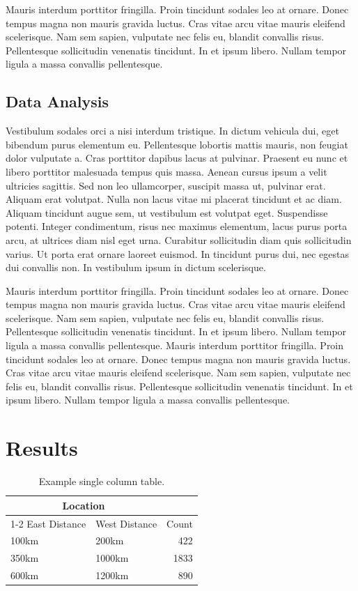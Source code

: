 Mauris interdum porttitor fringilla. Proin tincidunt sodales leo at ornare. Donec tempus magna non mauris gravida luctus. Cras vitae arcu vitae mauris eleifend scelerisque. Nam sem sapien, vulputate nec felis eu, blandit convallis risus. Pellentesque sollicitudin venenatis tincidunt. In et ipsum libero. Nullam tempor ligula a massa convallis pellentesque.

\subsection{Data Analysis}

Vestibulum sodales orci a nisi interdum tristique. In dictum vehicula dui, eget bibendum purus elementum eu. Pellentesque lobortis mattis mauris, non feugiat dolor vulputate a. Cras porttitor dapibus lacus at pulvinar. Praesent eu nunc et libero porttitor malesuada tempus quis massa. Aenean cursus ipsum a velit ultricies sagittis. Sed non leo ullamcorper, suscipit massa ut, pulvinar erat. Aliquam erat volutpat. Nulla non lacus vitae mi placerat tincidunt et ac diam. Aliquam tincidunt augue sem, ut vestibulum est volutpat eget. Suspendisse potenti. Integer condimentum, risus nec maximus elementum, lacus purus porta arcu, at ultrices diam nisl eget urna. Curabitur sollicitudin diam quis sollicitudin varius. Ut porta erat ornare laoreet euismod. In tincidunt purus dui, nec egestas dui convallis non. In vestibulum ipsum in dictum scelerisque.

Mauris interdum porttitor fringilla. Proin tincidunt sodales leo at ornare. Donec tempus magna non mauris gravida luctus. Cras vitae arcu vitae mauris eleifend scelerisque. Nam sem sapien, vulputate nec felis eu, blandit convallis risus. Pellentesque sollicitudin venenatis tincidunt. In et ipsum libero. Nullam tempor ligula a massa convallis pellentesque. Mauris interdum porttitor fringilla. Proin tincidunt sodales leo at ornare. Donec tempus magna non mauris gravida luctus. Cras vitae arcu vitae mauris eleifend scelerisque. Nam sem sapien, vulputate nec felis eu, blandit convallis risus. Pellentesque sollicitudin venenatis tincidunt. In et ipsum libero. Nullam tempor ligula a massa convallis pellentesque.


\section{Results}

\begin{table} %
	\caption{Example single column table.}
	\centering
	\begin{tabular}{l l r}
		\toprule
		\multicolumn{2}{c}{Location} \\
		\cmidrule(r){1-2}
		East Distance & West Distance & Count \\
		\midrule
		100km & 200km & 422 \\
		350km & 1000km & 1833 \\
		600km & 1200km & 890 \\
		\bottomrule
	\end{tabular}
	\label{tab:distcounts}
\end{table}

